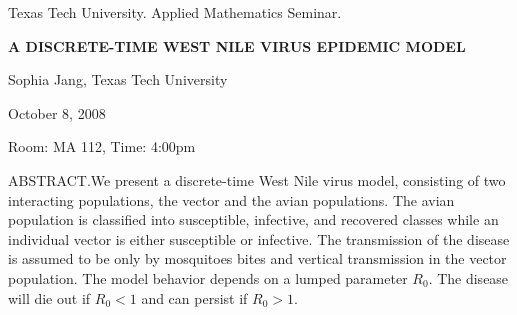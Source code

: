 \documentclass[oneside]{amsart}
\begin{document}
\begin{center}
Texas Tech University. Applied Mathematics Seminar.

\end{center}

\begin{center}

{\LARGE \uppercase{\textbf{A discrete-time West Nile virus epidemic model }}}

Sophia Jang, Texas Tech University

October 8, 2008

Room: MA 112, Time: 4:00pm

\end{center}


ABSTRACT.We present a discrete-time West Nile
virus model, consisting of two interacting populations, the vector
and the avian populations. The avian population is classified into
susceptible, infective, and recovered classes while an individual
vector is either susceptible or infective. The transmission of the
disease is assumed to be only by mosquitoes bites and vertical
transmission in the vector population. The model behavior depends
on a lumped parameter $R_0$. The disease will die out if $R_0<1$
and can persist if $R_0>1$.
\end{document}
